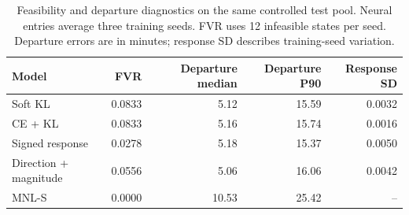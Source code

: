 \begin{table}[pos=htbp]
\centering\small
\caption{Feasibility and departure diagnostics on the same controlled test pool. Neural entries average three training seeds. FVR uses 12 infeasible states per seed. Departure errors are in minutes; response SD describes training-seed variation.}
\label{tab:matched_diagnostics}
\begin{tabular}{@{}lrrrr@{}}
\toprule
Model & FVR & Departure median & Departure P90 & Response SD \\
\midrule
Soft KL & 0.0833 & 5.12 & 15.59 & 0.0032 \\
CE + KL & 0.0833 & 5.16 & 15.74 & 0.0016 \\
Signed response & 0.0278 & 5.18 & 15.37 & 0.0050 \\
Direction + magnitude & 0.0556 & 5.06 & 16.06 & 0.0042 \\
MNL-S & 0.0000 & 10.53 & 25.42 & -- \\
\bottomrule
\end{tabular}
\end{table}
